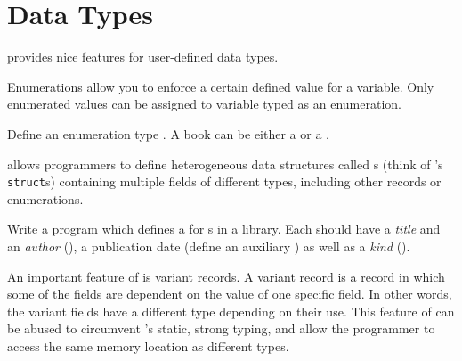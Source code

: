 \documentclass{../../tp}
\begin{document}
\section{Data Types}

\pascal provides nice features for user-defined data types. 

Enumerations allow you to enforce a certain defined value for a variable. Only enumerated values can be assigned to variable typed as an enumeration.

\begin{instruction}
	
Define an enumeration type . A book can be either a  or a .

\end{instruction}

\pascal allows programmers to define heterogeneous data structures called s (think of \C's \texttt{struct}s) containing multiple fields of different types, including other records or enumerations.

\begin{instruction}
Write a program which defines a  for s in a library. Each  should have a \emph{title} and an \emph{author} (), a publication date (define an auxiliary ) as well as a \emph{kind} ().
\end{instruction}

An important feature of \pascal is variant records. A variant record is a record in which some of the fields are dependent on the value of one specific field. In other words, the variant fields have a different type depending on their use. This feature of \pascal can be abused to circumvent \pascal's static, strong typing, and allow the programmer to access the same memory location as different types. 
\end{document}
